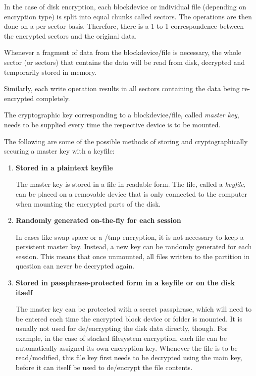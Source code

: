 In the case of disk encryption, each blockdevice or individual file (depending on encryption type) is split into equal chunks called sectors. The operations are then done on a per-sector basis. Therefore, there is a 1 to 1 correspondence between the encrypted sectors and the original data.

Whenever a fragment of data from the blockdevice/file is necessary, the whole sector (or sectors) that contains the data will be read from disk, decrypted and temporarily stored in memory.

Similarly, each write operation results in all sectors containing the data being re-encrypted completely.

The cryptographic key corresponding to a blockdevice/file, called \textit{master key}, needs to be supplied every time the respective device is to be mounted.

The following are some of the possible methods of storing and cryptographically securing a master key with a keyfile\cite{disk-enc}:
\begin{enumerate}
\item \textbf{Stored in a plaintext keyfile}

The master key is stored in a file in readable form. The file, called a \textit{keyfile}, can be placed on a removable device that is only connected to the computer when mounting the encrypted parts of the disk.

\item \textbf{Randomly generated on-the-fly for each session}

In cases like swap space or a /tmp encryption, it is not necessary to keep a persistent master key. Instead, a new key can be randomly generated for each session. This means that once unmounted, all files written to the partition in question can never be decrypted again.

\item \textbf{Stored in passphrase-protected form in a keyfile or on the disk itself}

The master key can be protected with a secret passphrase, which will need to be entered each time the encrypted block device or folder is mounted.
It is usually not used for de/encrypting the disk data directly, though. For example, in the case of stacked filesystem encryption, each file can be automatically assigned its own encryption key. Whenever the file is to be read/modified, this file key first needs to be decrypted using the main key, before it can itself be used to de/encrypt the file contents.

\end{enumerate}


